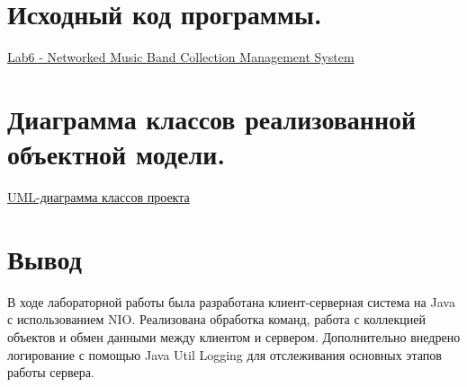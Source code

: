 \documentclass[12pt, a4paper]{article}
\begin{document}
\begin{itemize}
\begin{itemize}
\end{itemize}

\newpage
\section{Исходный код программы.}
\href{https://github.com/mohamedellithyyyy/ITMO-Hub/tree/main/Programming/Semester-2/Labs/Lab6}{Lab6 -  Networked Music Band Collection Management System}


\section{Диаграмма классов реализованной объектной модели.}
\href{https://github.com/mohamedellithyyyy/ITMO-Hub/tree/main/Programming/Semester-2/Labs/Lab6/docs/UML}{UML-диаграмма классов проекта}
\section{Вывод}
В ходе лабораторной работы была разработана клиент-серверная система на Java с использованием NIO. Реализована обработка команд, работа с коллекцией объектов и обмен данными между клиентом и сервером. Дополнительно внедрено логирование с помощью Java Util Logging для отслеживания основных этапов работы сервера.
\end{document}
